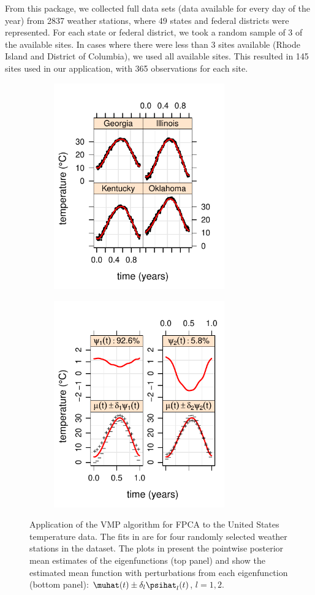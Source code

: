 \documentclass[12pt]{article}
\theoremstyle{plain}
\theoremstyle{definition}
\theoremstyle{remark}
\begin{document}
From this package, we collected full data sets (data available for every day
of the year) from 2837 weather stations, where 49 states and federal districts were represented. For each
state or federal district, we took a random sample of 3 of the available sites. In cases where there were
less than 3 sites available (Rhode Island and District of Columbia), we used all available sites. This resulted
in 145 sites used in our application, with 365 observations for each site.

\begin{figure}
	\centering
	\begin{subfigure}[t]{0.49\textwidth}
		\centering
		\includegraphics[width=2.9in]{images/us_fits.pdf}
	\caption{}
	\label{subfig:us_fits}
	\end{subfigure}
	\begin{subfigure}[t]{0.49\textwidth}
		\centering
		\includegraphics[width=2.9in]{images/us_bf.pdf}
	\caption{}
	\label{subfig:us_mean_shift}
	\end{subfigure}
\caption{
	Application of the VMP algorithm for FPCA to the United States temperature data. The fits in 
	are for four randomly selected weather stations in the dataset.
	The plots in  present the pointwise posterior mean estimates of the eigenfunctions
	(top panel) and
	show the estimated mean function with
	perturbations from each eigenfunction (bottom panel): $\muhat (t) \pm \delta_l \psihat_l (t)$,
	$l = 1, 2$.
}
\label{fig:us_weather_data}
\end{figure}
\end{document}
